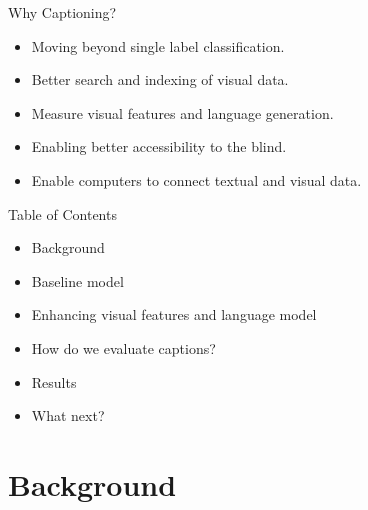 \documentclass{beamer}
\begin{document}
\begin{frame}{Why Captioning?}
\begin{itemize}
\item Moving beyond single label classification.
\item Better search and indexing of visual data.
\item Measure visual features and language generation.
\item Enabling better accessibility to the blind.
\item Enable computers to connect textual and visual data. 
\end{itemize}
\end{frame}
\begin{frame}{Table of Contents}
\begin{itemize}
\item Background 
\item Baseline model
\item Enhancing visual features and language model 
\item How do we evaluate captions?
\item Results
\item What next?
\end{itemize} 

\end{frame}

\section{Background}
\end{document}
